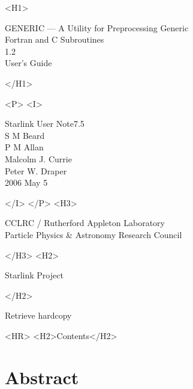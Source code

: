 \documentclass[twoside,11pt]{article}
\newcommand{\stardoccategory}  {Starlink User Note}
\newcommand{\stardocsource}    {sun7.5}
\newcommand{\stardocnumber}    {7.5}
\newcommand{\stardocauthors}   {S M Beard \\ P M Allan\\ Malcolm J. Currie\\ Peter W. Draper}
\newcommand{\stardocdate}      {2006 May 5}
\newcommand{\stardoctitle}     {GENERIC --- A Utility for Preprocessing Generic
				\\ Fortran and C Subroutines}
\newcommand{\stardocversion}   {1.2}
\newcommand{\stardocmanual}    {User's Guide}
\renewcommand{\_}{{\tt\char'137}}     %
\newcommand{\htmladdnormallink}[2]{#1}
\newcommand{\htmladdimg}[1]{}
\newcommand{\htmlref}[2]{#1}
\newcommand{\htmladdtonavigation}[1]{}
\newcommand{\xlabel}[1]{}
\newcommand{\latexonlytoc}[0]{\tableofcontents}
\begin{document}
\begin{htmlonly}
   \xlabel{}
   \begin{rawhtml} <H1> \end{rawhtml}
      \stardoctitle\\
      \stardocversion\\
      \stardocmanual
   \begin{rawhtml} </H1> \end{rawhtml}


   \begin{rawhtml} <P> <I> \end{rawhtml}
   \stardoccategory \stardocnumber \\
   \stardocauthors \\
   \stardocdate
   \begin{rawhtml} </I> </P> <H3> \end{rawhtml}
      \htmladdnormallink{CCLRC}{http://www.cclrc.ac.uk} /
      \htmladdnormallink{Rutherford Appleton Laboratory}
                        {http://www.cclrc.ac.uk/ral} \\
      \htmladdnormallink{Particle Physics \& Astronomy Research Council}
                        {http://www.pparc.ac.uk} \\
   \begin{rawhtml} </H3> <H2> \end{rawhtml}
      \htmladdnormallink{Starlink Project}{http://www.starlink.rl.ac.uk/}
   \begin{rawhtml} </H2> \end{rawhtml}
   \htmladdnormallink{\htmladdimg{source.gif} Retrieve hardcopy}
      {http://www.starlink.rl.ac.uk/cgi-bin/hcserver?\stardocsource}\\

  \label{stardoccontents}
  \begin{rawhtml} 
    <HR>
    <H2>Contents</H2>
  \end{rawhtml}
  \renewcommand{\latexonlytoc}[0]{}
  \htmladdtonavigation{\htmlref{\htmladdimg{contents_motif.gif}}
        {stardoccontents}}

  \section{\xlabel{abstract}Abstract}
\end{htmlonly}
\end{document}
